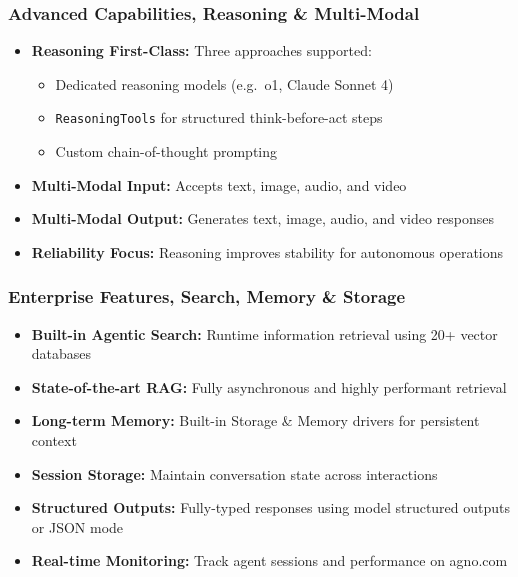 \begin{frame}[fragile]\frametitle{Advanced Capabilities, Reasoning \& Multi-Modal}
      \begin{itemize}
        \item \textbf{Reasoning First-Class:} Three approaches supported:
              \begin{itemize}
                  \item Dedicated reasoning models (e.g.\ o1, Claude Sonnet 4)
                  \item \texttt{ReasoningTools} for structured think-before-act steps
                  \item Custom chain-of-thought prompting
              \end{itemize}
        \item \textbf{Multi-Modal Input:} Accepts text, image, audio, and video
        \item \textbf{Multi-Modal Output:} Generates text, image, audio, and video responses
        \item \textbf{Reliability Focus:} Reasoning improves stability for autonomous operations
      \end{itemize}
\end{frame}

\begin{frame}[fragile]\frametitle{Enterprise Features, Search, Memory \& Storage}
      \begin{itemize}
        \item \textbf{Built-in Agentic Search:} Runtime information retrieval using 20+ vector databases
        \item \textbf{State-of-the-art RAG:} Fully asynchronous and highly performant retrieval
        \item \textbf{Long-term Memory:} Built-in Storage \& Memory drivers for persistent context
        \item \textbf{Session Storage:} Maintain conversation state across interactions
        \item \textbf{Structured Outputs:} Fully-typed responses using model structured outputs or JSON mode
        \item \textbf{Real-time Monitoring:} Track agent sessions and performance on agno.com
      \end{itemize}
\end{frame}

